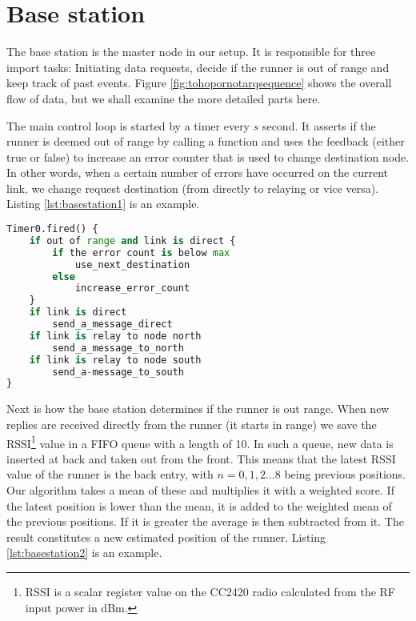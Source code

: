 \section{Base station}\label{sc:basestation}

The base station is the master node in our setup. It is responsible for three import tasks: Initiating data requests, decide if the runner is out of range and keep track of past events. Figure \ref{fig:tohopornotarqsequence} shows the overall flow of data, but we shall examine the more detailed parts here.

\noindent The main control loop is started by a timer every $s$ second. It asserts if the runner is deemed out of range by calling a function and uses the feedback (either true or false) to increase an error counter that is used to change destination node. In other words, when a certain number of errors have occurred on the current link, we change request destination (from directly to relaying or vice versa). Listing \ref{lst:basestation1} is an example.
\noindent
\begin{minipage}[t]{0.95\linewidth}
	\begin{lstlisting}[language=Python, numbers=none, caption=XXX, label={lst:basestation1}]
Timer0.fired() {
	if out of range and link is direct {
		if the error count is below max
			use_next_destination
		else
			increase_error_count
	}
	if link is direct
		send_a_message_direct
	if link is relay to node north
		send_a_message_to_north
	if link is relay to node south
		send_a-message_to_south
}
	\end{lstlisting}
\end{minipage}

\noindent Next is how the base station determines if the runner is out range. When new replies are received directly from the runner (it starts in range) we save the RSSI\footnote{RSSI is a scalar register value on the CC2420 radio calculated from the RF input power in dBm.} value in a FIFO queue with a length of 10. In such a queue, new data is inserted at back and taken out from the front. This means that the latest RSSI value of the runner is the back entry, with $n=0,1,2 ... 8$ being previous positions. Our algorithm takes a mean of these and multiplies it with a weighted score. If the latest position is lower than the mean, it is added to the weighted mean of the previous positions. If it is greater the average is then subtracted from it. The result constitutes a new estimated position of the runner. Listing \ref{lst:basestation2} is an example.

